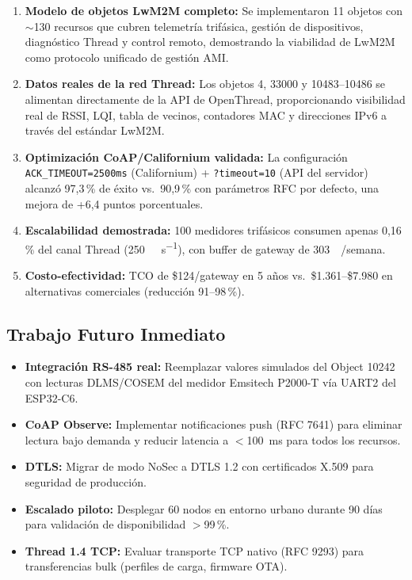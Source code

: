 \documentclass[11pt,a4paper]{article}
\begin{document}
\begin{enumerate}[leftmargin=1.5cm]
    \item \textbf{Modelo de objetos LwM2M completo:} Se implementaron 11 objetos con $\sim$130 recursos que cubren telemetría trifásica, gestión de dispositivos, diagnóstico Thread y control remoto, demostrando la viabilidad de LwM2M como protocolo unificado de gestión AMI.

    \item \textbf{Datos reales de la red Thread:} Los objetos 4, 33000 y 10483--10486 se alimentan directamente de la API de OpenThread, proporcionando visibilidad real de RSSI, LQI, tabla de vecinos, contadores MAC y direcciones IPv6 a través del estándar LwM2M.

    \item \textbf{Optimización CoAP/Californium validada:} La configuración \texttt{ACK\_TIMEOUT=2500ms} (Californium) + \texttt{?timeout=10} (API del servidor) alcanzó 97,3\,\% de éxito vs.\ 90,9\,\% con parámetros RFC por defecto, una mejora de +6,4 puntos porcentuales.

    \item \textbf{Escalabilidad demostrada:} 100 medidores trifásicos consumen apenas 0,16\,\% del canal Thread (\SI{250}{\kilo\bit\per\second}), con buffer de gateway de \SI{303}{\mega\byte}/semana.

    \item \textbf{Costo-efectividad:} TCO de \$124/gateway en 5 años vs.\ \$1.361--\$7.980 en alternativas comerciales (reducción 91--98\,\%).
\end{enumerate}

\subsection{Trabajo Futuro Inmediato}

\begin{itemize}[leftmargin=1.2cm]
    \item \textbf{Integración RS-485 real:} Reemplazar valores simulados del Object 10242 con lecturas DLMS/COSEM del medidor Emsitech P2000-T vía UART2 del ESP32-C6.
    \item \textbf{CoAP Observe:} Implementar notificaciones push (RFC 7641) para eliminar lectura bajo demanda y reducir latencia a $<$\SI{100}{\milli\second} para todos los recursos.
    \item \textbf{DTLS:} Migrar de modo NoSec a DTLS 1.2 con certificados X.509 para seguridad de producción.
    \item \textbf{Escalado piloto:} Desplegar 60 nodos en entorno urbano durante 90 días para validación de disponibilidad $>$99\,\%.
    \item \textbf{Thread 1.4 TCP:} Evaluar transporte TCP nativo (RFC 9293) para transferencias bulk (perfiles de carga, firmware OTA).
\end{itemize}
\end{document}
